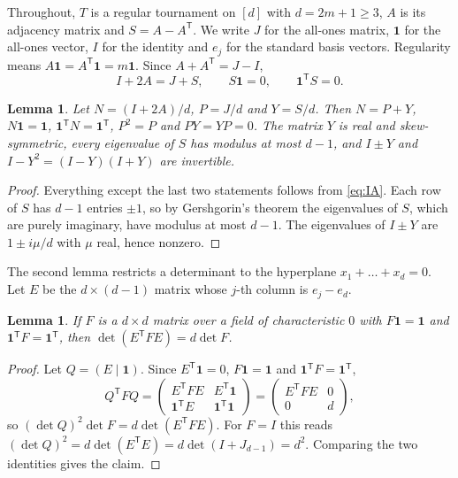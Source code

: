 \documentclass[11pt]{amsart}
\newtheorem{lemma}[theorem]{Lemma}
\theoremstyle{remark}
\numberwithin{equation}{section}
\newcommand{\one}{\mathbf{1}}
\newcommand{\T}{\mathsf{T}}
\begin{document}
Throughout, $T$ is a regular tournament on $[d]$ with $d=2m+1\ge3$, $A$ is its adjacency matrix and $S=A-A^\T$. We write $J$ for the all-ones matrix, $\one$ for the all-ones vector, $I$ for the identity and $e_j$ for the standard basis vectors. Regularity means $A\one=A^\T\one=m\one$. Since $A+A^\T=J-I$,
\begin{equation}\label{eq:IA}
I+2A=J+S,\qquad S\one=0,\qquad \one^\T S=0.
\end{equation}

\begin{lemma}\label{lem:N}
Let $N=(I+2A)/d$, $P=J/d$ and $Y=S/d$. Then $N=P+Y$, $N\one=\one$, $\one^\T N=\one^\T$, $P^2=P$ and $PY=YP=0$. The matrix $Y$ is real and skew-symmetric, every eigenvalue of $S$ has modulus at most $d-1$, and $I\pm Y$ and $I-Y^2=(I-Y)(I+Y)$ are invertible.
\end{lemma}

\begin{proof}
Everything except the last two statements follows from \eqref{eq:IA}. Each row of $S$ has $d-1$ entries $\pm1$, so by Gershgorin's theorem the eigenvalues of $S$, which are purely imaginary, have modulus at most $d-1$. The eigenvalues of $I\pm Y$ are $1\pm i\mu/d$ with $\mu$ real, hence nonzero.
\end{proof}

The second lemma restricts a determinant to the hyperplane $x_1+\dots+x_d=0$. Let $E$ be the $d\times(d-1)$ matrix whose $j$-th column is $e_j-e_d$.

\begin{lemma}\label{lem:border}
If $F$ is a $d\times d$ matrix over a field of characteristic $0$ with $F\one=\one$ and $\one^\T F=\one^\T$, then $\det(E^\T FE)=d\det F$.
\end{lemma}

\begin{proof}
Let $Q=(E\mid\one)$. Since $E^\T\one=0$, $F\one=\one$ and $\one^\T F=\one^\T$,
\[
Q^\T FQ=\begin{pmatrix}E^\T FE&E^\T\one\\ \one^\T E&\one^\T\one\end{pmatrix}=\begin{pmatrix}E^\T FE&0\\0&d\end{pmatrix},
\]
so $(\det Q)^2\det F=d\det(E^\T FE)$. For $F=I$ this reads $(\det Q)^2=d\det(E^\T E)=d\det(I+J_{d-1})=d^2$. Comparing the two identities gives the claim.
\end{proof}
\end{document}
